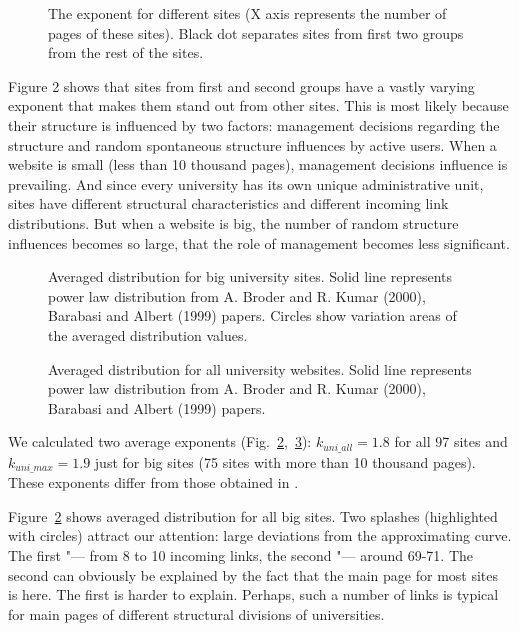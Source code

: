 \begin{figure}[ht]
	\caption{The exponent for different sites (X axis represents the number of pages of these sites). Black dot separates sites from first two groups from the rest of the sites.}\label{fig:sitesExponent}
\end{figure}

Figure 2 shows that sites from first and second groups have a vastly varying exponent that makes them stand out from other sites. This is most likely because their structure is influenced by two factors: management decisions regarding the structure and random spontaneous structure influences by active users. When a website is small (less than 10 thousand pages), management decisions influence is prevailing. And since every university has its own unique administrative unit, sites have different structural characteristics and different incoming link distributions. But when a website is big, the number of random structure influences becomes so large, that the role of management becomes less significant. 

\begin{figure}[ht]
	\caption{Averaged distribution for big university sites. Solid line represents power law distribution from A. Broder and R. Kumar (2000), Barabasi and Albert (1999) papers. Circles show variation areas of the averaged distribution values.}\label{fig:bigUniAveragedDistribution}
\end{figure}

\begin{figure}[ht]
	\caption{Averaged distribution for all university websites. Solid line represents power law distribution from A. Broder and R. Kumar (2000), Barabasi and Albert (1999) papers.}\label{fig:allUniAveragedDistribution}
\end{figure}

We calculated two average exponents (Fig.~\cref{fig:bigUniAveragedDistribution},~\cref{fig:allUniAveragedDistribution}): \(k_\textit{uni\_all} = 1.8\) for all 97 sites and \(k_\textit{uni\_max} = 1.9\) just for big sites (75 sites with more than 10 thousand pages). These exponents differ from those obtained in \cite{BarabasiAlbert,BroderKumarMaghoul}. 

Figure~\cref{fig:bigUniAveragedDistribution} shows averaged distribution for all big sites. Two splashes (highlighted with circles) attract our attention: large deviations from the approximating curve. The first "--- from 8 to 10 incoming links, the second "--- around 69-71. The second can obviously be explained by the fact that the main page for most sites is here. The first is harder to explain. Perhaps, such a number of links is typical for main pages of different structural divisions of universities.

